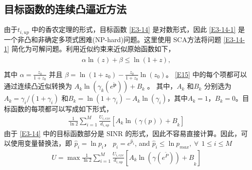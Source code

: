 \subsection{ 目标函数的连续凸逼近方法}\label{section3-3-1}
由于$t_{i,up}$ 中的香农定理的形式，目标函数 \eqref{E3-14} 是对数形式，因此 \eqref{E3-14-1} 是一个非凸和非确定多项式困难(NP-hard)问题。这里使用 SCA方法将问题 \eqref{E3-14-1} 简化为可解问题。利用近似约束来近似原始函数如下，
\begin{eqnarray}\label{E15}
\begin{array}{ll}
\alpha \ln{\left(z\right)}+\beta\le \ln{\left(1+z\right)},\\
\end{array}
\end{eqnarray}
其中 $\alpha=\frac{z_0}{1+z_0}$ 并且 $\beta=\ln{\left(1+z_0\right)}-\frac{z_0}{1+z_0}\ln{\left(z_0\right)}$。 \eqref{E15} 中的每个项都可以通过连续凸近似转换为 $A_k\ln\left(\gamma_k\left(e^{\widetilde{\mathbf{p}}}\right)\right)+B_k$ 。 其中，$A_k$ 和$B_k$ 分别选为$A_k=\gamma_i/\left(1+\gamma_i\right)$ 和$B_k=\ln{\left(1+\gamma_i\right)}-A_k\ln{\left(\gamma_i\right)}$，其中$A_k=1$，$B_k=0$。目标函数的每项都可以写成如下形式，
\begin{eqnarray}\label{E16}
\frac{1}{\ln{2}}\sum_{i=1}^{M}{\frac{U_{i,exe}}{d_{i,up}}\left.\left[{A_k\ln{\left(\gamma\left(p\right)\right)}+B}_k\right.\right]}
\end{eqnarray}
由于 \eqref{E3-14} 中的目标函数部分是 SINR 的形式，因此不容易直接计算。因此，可以使用变量替换法，即 ${\hat{p}}_i=\ln{p_i}$，
$p_i=e^{{\hat{p}}_i}$, and ${\hat{p}}_i\le \ln{p_{max}},\ \forall\ \ 1\le i\le M$
\begin{eqnarray}\label{E17}
U=\max\frac{1}{\ln{2}}\sum_{i=1}^{M}\left.\frac{U_{i,exe}}{d_{i,up}}\left[{A_k\ln{\left(\gamma\left(e^{\widetilde{P}}\right)\right)}+B}_k\right.\right]
\end{eqnarray}

